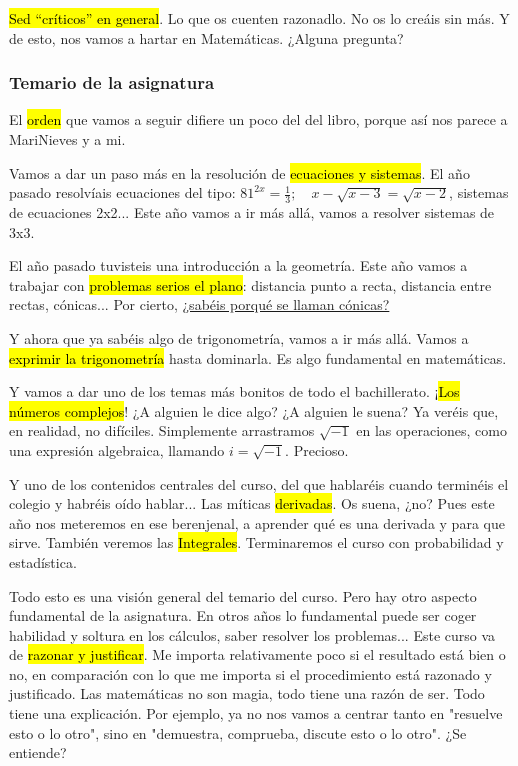 \documentclass[palatino,nosec]{Docencia}
\begin{document}
\hl{Sed “críticos” en general}. Lo que os cuenten razonadlo. No os lo creáis sin más. Y de esto, nos vamos a hartar en Matemáticas. ¿Alguna pregunta?

\subsubsection{Temario de la asignatura}

El \hl{orden} que vamos a seguir difiere un poco del del libro, porque así nos parece a MariNieves y a mi. 

Vamos a dar un paso más en la resolución de \hl{ecuaciones y sistemas}. 
%
El año pasado resolvíais ecuaciones del tipo: $81^{2x} = \frac{1}{3};\quad x-\sqrt{x-3} = \sqrt{x-2}$, sistemas de ecuaciones 2x2... Este año vamos a ir más allá, vamos a resolver sistemas de 3x3. 

El año pasado tuvisteis una introducción a la geometría. Este año vamos a trabajar con \hl{problemas serios el plano}: distancia punto a recta, distancia entre rectas, cónicas... Por cierto, \ul{¿sabéis porqué se llaman cónicas?}

Y ahora que ya sabéis algo de trigonometría, vamos a ir más allá. Vamos a \hl{exprimir la trigonometría} hasta dominarla. Es algo fundamental en matemáticas. 

Y vamos a dar uno de los temas más bonitos de todo el bachillerato. ¡\hl{Los números complejos}! ¿A alguien le dice algo? ¿A alguien le suena? 
%
Ya veréis que, en realidad, no difíciles. Simplemente arrastramos $\sqrt{-1}$ en las operaciones, como una expresión algebraica, llamando $i=\sqrt{-1}$. 
%
Precioso. 

Y uno de los contenidos centrales del curso, del que hablaréis cuando terminéis el colegio y habréis oído hablar... Las míticas \hl{derivadas}. Os suena, ¿no? 
%
Pues este año nos meteremos en ese berenjenal, a aprender qué es una derivada y para que sirve.
%
También veremos las \hl{Integrales}.
%
Terminaremos el curso con probabilidad y estadística.

Todo esto es una visión general del temario del curso. 
%
Pero hay otro aspecto fundamental de la asignatura. 
%
En otros años lo fundamental puede ser coger habilidad y soltura en los cálculos, saber resolver los problemas... 
%
Este curso va de \hl{razonar y justificar}. Me importa relativamente poco si el resultado está bien o no, en comparación con lo que me importa si el procedimiento está razonado y justificado. 
%
Las matemáticas no son magia, todo tiene una razón de ser. Todo tiene una explicación. 
%
Por ejemplo, ya no nos vamos a centrar tanto en "resuelve esto o lo otro", sino en "demuestra, comprueba, discute esto o lo otro".
%
¿Se entiende?
\end{document}
